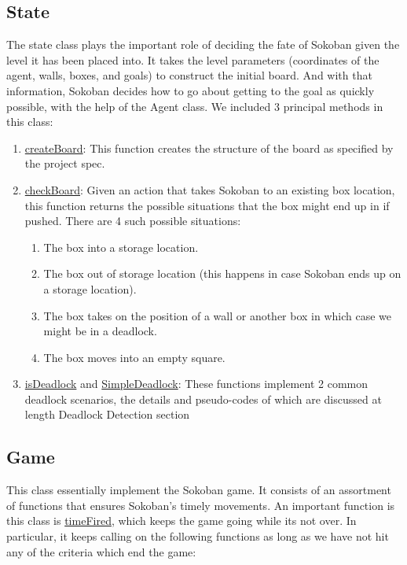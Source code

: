 \documentclass{article}
\begin{document}
\subsection{State}
The state class plays the important role of deciding the fate of Sokoban given the level it has been placed into. It takes the level parameters (coordinates of the agent, walls, boxes, and goals) to construct the initial board. And with that information, Sokoban decides how to go about getting to the goal as quickly possible, with the help of the Agent class. We included 3 principal methods in this class: 

\begin{enumerate}[label=\alph*)]
    \item \underline{createBoard}: This function creates the structure of the board as specified by the project spec.  %
    \item \underline{checkBoard}: Given an action that takes Sokoban to an existing box location, this function returns the possible situations that the box might end up in if pushed. There are 4 such possible situations:
    
    \begin{enumerate}[label=\arabic*)]
        \item The box into a storage location. 
        \item The box out of storage location (this happens in case Sokoban ends up on a storage location).
        \item The box takes on the position of a wall or another box in which case we might be in a deadlock.
        \item The box moves into an empty square. 
    \end{enumerate}
    
    \item \underline{isDeadlock} and \underline{SimpleDeadlock}: These functions implement 2 common deadlock scenarios, the details and pseudo-codes of which are discussed at length Deadlock Detection section 
\end{enumerate}

\subsection{Game}
This class essentially implement the Sokoban game. It consists of an assortment of functions that ensures Sokoban's timely movements. An important function is this class is \underline{timeFired}, which keeps the game going while its not over. In particular, it keeps calling on the following functions as long as we have not hit any of the criteria which end the game: 
\end{document}
